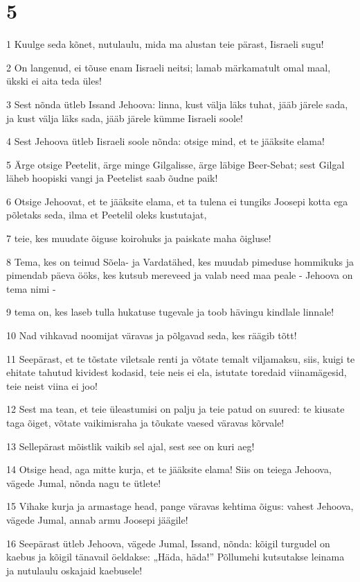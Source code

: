 \chapter{5}

\par 1 Kuulge seda kõnet, nutulaulu, mida ma alustan teie pärast, Iisraeli sugu!
\par 2 On langenud, ei tõuse enam Iisraeli neitsi; lamab märkamatult omal maal, ükski ei aita teda üles!
\par 3 Sest nõnda ütleb Issand Jehoova: linna, kust välja läks tuhat, jääb järele sada, ja kust välja läks sada, jääb järele kümme Iisraeli soole!
\par 4 Sest Jehoova ütleb Iisraeli soole nõnda: otsige mind, et te jääksite elama!
\par 5 Ärge otsige Peetelit, ärge minge Gilgalisse, ärge läbige Beer-Sebat; sest Gilgal läheb hoopiski vangi ja Peetelist saab õudne paik!
\par 6 Otsige Jehoovat, et te jääksite elama, et ta tulena ei tungiks Joosepi kotta ega põletaks seda, ilma et Peetelil oleks kustutajat,
\par 7 teie, kes muudate õiguse koirohuks ja paiskate maha õigluse!
\par 8 Tema, kes on teinud Sõela- ja Vardatähed, kes muudab pimeduse hommikuks ja pimendab päeva ööks, kes kutsub mereveed ja valab need maa peale - Jehoova on tema nimi -
\par 9 tema on, kes laseb tulla hukatuse tugevale ja toob hävingu kindlale linnale!
\par 10 Nad vihkavad noomijat väravas ja põlgavad seda, kes räägib tõtt!
\par 11 Seepärast, et te tõstate viletsale renti ja võtate temalt viljamaksu, siis, kuigi te ehitate tahutud kividest kodasid, teie neis ei ela, istutate toredaid viinamägesid, teie neist viina ei joo!
\par 12 Sest ma tean, et teie üleastumisi on palju ja teie patud on suured: te kiusate taga õiget, võtate vaikimisraha ja tõukate vaesed väravas kõrvale!
\par 13 Sellepärast mõistlik vaikib sel ajal, sest see on kuri aeg!
\par 14 Otsige head, aga mitte kurja, et te jääksite elama! Siis on teiega Jehoova, vägede Jumal, nõnda nagu te ütlete!
\par 15 Vihake kurja ja armastage head, pange väravas kehtima õigus: vahest Jehoova, vägede Jumal, annab armu Joosepi jäägile!
\par 16 Seepärast ütleb Jehoova, vägede Jumal, Issand, nõnda: kõigil turgudel on kaebus ja kõigil tänavail öeldakse: „Häda, häda!” Põllumehi kutsutakse leinama ja nutulaulu oskajaid kaebusele!
